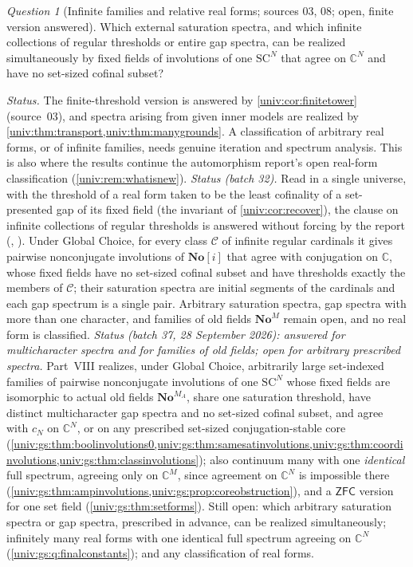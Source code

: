 \documentclass[11pt,letterpaper]{article}
\numberwithin{equation}{section}
\theoremstyle{definition}
\theoremstyle{remark}
\newtheorem{question}[question]{Question}
\newcommand{\No}{\mathbf{No}}
\newcommand{\SC}{\mathrm{SC}}
\newcommand{\NoM}{\No^{M}}
\newcommand{\SCN}{\SC^{N}}
\newcommand{\C}{\mathbb C}
\newcommand{\ZFC}{\mathsf{ZFC}}
\begin{document}
\begin{question}[Infinite families and relative real forms; sources 03, 08; open, finite version answered]\label{univ:q:families}
Which external saturation spectra, and which infinite collections of regular
thresholds or entire gap spectra, can be realized simultaneously by fixed fields
of involutions of one $\SCN$ that agree on $\C^N$ and have no set-sized cofinal
subset?
\end{question}
\emph{Status.} The finite-threshold version is answered by
\cref{univ:cor:finitetower} (source~03), and spectra arising from given inner
models are realized by \cref{univ:thm:transport,univ:thm:manygrounds}. A
classification of arbitrary real forms, or of infinite families, needs genuine
iteration and spectrum analysis. This is also where the results continue the
automorphism report's open real-form classification (\cref{univ:rem:whatisnew}).
\emph{Status (batch 32).} Read in a single universe, with the threshold of a
real form taken to be the least cofinality of a set-presented gap of its fixed
field (the invariant of \cref{univ:cor:recover}), the clause on infinite
collections of regular thresholds is answered without forcing by the report
 (,
). Under Global Choice, for every class $\mathcal C$ of
infinite regular cardinals it gives pairwise nonconjugate involutions of
$\No[i]$ that agree with conjugation on $\C$, whose fixed fields have no
set-sized cofinal subset and have thresholds exactly the members of
$\mathcal C$; their saturation spectra are initial segments of the cardinals
and each gap spectrum is a single pair. Arbitrary saturation spectra, gap
spectra with more than one character, and families of old fields $\NoM$ remain
open, and no real form is classified.
\emph{Status (batch 37, 28 September 2026): answered for multicharacter
spectra and for families of old fields; open for arbitrary prescribed spectra.}
Part~VIII realizes, under Global Choice, arbitrarily large set-indexed families of
pairwise nonconjugate involutions of one $\SCN$ whose fixed fields are
isomorphic to actual old fields $\No^{M_A}$, share one saturation threshold, have
distinct multicharacter gap spectra and no set-sized cofinal subset, and agree with
$c_N$ on $\C^N$, or on any prescribed set-sized conjugation-stable core
(\cref{univ:gs:thm:boolinvolutions0,univ:gs:thm:samesatinvolutions,univ:gs:thm:coordinvolutions,univ:gs:thm:classinvolutions});
also continuum many with one \emph{identical} full spectrum, agreeing only on
$\C^M$, since agreement on $\C^N$ is impossible there
(\cref{univ:gs:thm:ampinvolutions,univ:gs:prop:coreobstruction}), and a $\ZFC$
version for one set field (\cref{univ:gs:thm:setforms}). Still open: which
arbitrary saturation spectra or gap spectra, prescribed in advance, can be
realized simultaneously; infinitely many real forms with one identical full
spectrum agreeing on $\C^N$ (\cref{univ:gs:q:finalconstants}); and any
classification of real forms.
\end{document}
